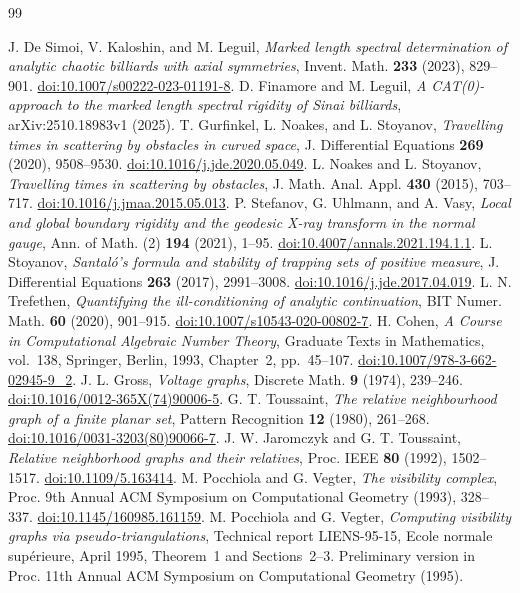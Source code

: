 \begin{thebibliography}{99}
\raggedright
{}
J. De Simoi, V. Kaloshin, and M. Leguil,
\emph{Marked length spectral determination of analytic chaotic billiards
with axial symmetries}, Invent. Math. \textbf{233} (2023), 829--901.
\href{https://doi.org/10.1007/s00222-023-01191-8}{doi:10.1007/s00222-023-01191-8}.
D. Finamore and M. Leguil,
\emph{A CAT(0)-approach to the marked length spectral rigidity of Sinai
billiards}, arXiv:2510.18983v1 (2025).
T. Gurfinkel, L. Noakes, and L. Stoyanov,
\emph{Travelling times in scattering by obstacles in curved space},
J. Differential Equations \textbf{269} (2020), 9508--9530.
\href{https://doi.org/10.1016/j.jde.2020.05.049}{doi:10.1016/j.jde.2020.05.049}.
L. Noakes and L. Stoyanov,
\emph{Travelling times in scattering by obstacles},
J. Math. Anal. Appl. \textbf{430} (2015), 703--717.
\href{https://doi.org/10.1016/j.jmaa.2015.05.013}{doi:10.1016/j.jmaa.2015.05.013}.
P. Stefanov, G. Uhlmann, and A. Vasy,
\emph{Local and global boundary rigidity and the geodesic X-ray transform
in the normal gauge}, Ann. of Math. (2) \textbf{194} (2021), 1--95.
\href{https://doi.org/10.4007/annals.2021.194.1.1}{doi:10.4007/annals.2021.194.1.1}.
L. Stoyanov,
\emph{Santal\'o's formula and stability of trapping sets of positive measure},
J. Differential Equations \textbf{263} (2017), 2991--3008.
\href{https://doi.org/10.1016/j.jde.2017.04.019}{doi:10.1016/j.jde.2017.04.019}.
L. N. Trefethen,
\emph{Quantifying the ill-conditioning of analytic continuation},
BIT Numer. Math. \textbf{60} (2020), 901--915.
\href{https://doi.org/10.1007/s10543-020-00802-7}{doi:10.1007/s10543-020-00802-7}.
H. Cohen, \emph{A Course in Computational Algebraic Number Theory},
Graduate Texts in Mathematics, vol.~138, Springer, Berlin, 1993,
Chapter~2, pp.~45--107.
\href{https://doi.org/10.1007/978-3-662-02945-9_2}{doi:10.1007/978-3-662-02945-9\_2}.
J. L. Gross, \emph{Voltage graphs}, Discrete Math. \textbf{9} (1974),
239--246.
\href{https://doi.org/10.1016/0012-365X(74)90006-5}{doi:10.1016/0012-365X(74)90006-5}.
G. T. Toussaint, \emph{The relative neighbourhood graph of a finite planar
set}, Pattern Recognition \textbf{12} (1980), 261--268.
\href{https://doi.org/10.1016/0031-3203(80)90066-7}{doi:10.1016/0031-3203(80)90066-7}.
J. W. Jaromczyk and G. T. Toussaint,
\emph{Relative neighborhood graphs and their relatives},
Proc. IEEE \textbf{80} (1992), 1502--1517.
\href{https://doi.org/10.1109/5.163414}{doi:10.1109/5.163414}.
M. Pocchiola and G. Vegter, \emph{The visibility complex},
Proc. 9th Annual ACM Symposium on Computational Geometry (1993), 328--337.
\href{https://doi.org/10.1145/160985.161159}{doi:10.1145/160985.161159}.
M. Pocchiola and G. Vegter,
\emph{Computing visibility graphs via pseudo-triangulations},
Technical report LIENS-95-15, Ecole normale sup\'erieure, April 1995,
Theorem~1 and Sections~2--3. Preliminary version in Proc. 11th Annual
ACM Symposium on Computational Geometry (1995).
\end{thebibliography}
